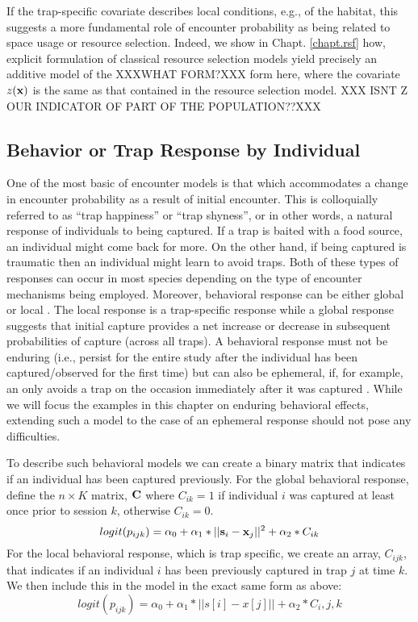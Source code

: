 If the trap-specific covariate describes local conditions, e.g., of
the habitat, this suggests a more fundamental role of encounter
probability as being related to space usage or resource
selection. Indeed, we show in Chapt. \ref{chapt.rsf} how, explicit
formulation of classical 
resource selection models yield precisely an additive model of the XXXWHAT FORM?XXX
form here, where the covariate $z({\bf x})$ is the same as that
contained in the resource selection model. XXX ISNT Z OUR INDICATOR OF PART OF THE POPULATION??XXX 









\subsection{Behavior or Trap Response by Individual}

One of the most basic of encounter models is that which accommodates a
change in encounter probability as a result of initial encounter.
This is colloquially referred to as ``trap happiness'' or ``trap shyness'', or in other words, a
natural response of individuals to being captured. If a trap is baited
with a food source, an individual might come back for
more. On the other hand, if being captured is traumatic then an
individual might learn to avoid traps. Both of these types of
responses can occur in most species depending on the type of encounter
mechanisms being employed. Moreover, behavioral response can be either
global \citep{gardner_etal:2010} or local \citep{royle_etal:2009jwm}.
The local response is a trap-specific response 
while a global response suggests that
initial capture provides a net increase or decrease in subsequent probabilities of capture (across all
traps). A behavioral response must not be enduring (i.e., persist for the entire study after the individual has been captured/observed for the first time) but can also be ephemeral, if, for example, an only avoids a trap on the occasion immediately after it was captured \citep{royle:2008B, yang_chao:2005}. While we will focus the examples in this chapter on enduring behavioral effects, extending such a model to the case of an ephemeral response should not pose any difficulties. 

To describe such behavioral models we can create a binary matrix that indicates
if an individual has been captured previously.  For the global
behavioral response, define the $n \times K$ matrix,
${\bf C}$ where $C_{ik} =1$
if individual $i$ was captured at least once prior to session
$k$, otherwise $C_{ik} = 0$.
\[
logit(p_{ijk}) = \alpha_{0} + \alpha_1 *||{\bf s}_{i}-{\bf x}_{j}||^{2} + \alpha_2*C_{ik}
\]
For the local behavioral response, which is trap specific, we create
an array, $C_{ijk}$, that indicates if an individual $i$ has been
previously captured in trap $j$ at time $k$.  We then include this in
the model in the exact same form as above:
\[
logit(p_{ijk}) = \alpha_{0} + \alpha_1*||s[i]-x[j]|| + \alpha_2*C_i,j,k
\]


